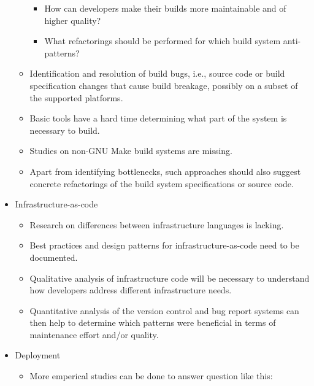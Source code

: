 \documentclass[]{book}
\providecommand{\tightlist}{%
  \setlength{\itemsep}{0pt}\setlength{\parskip}{0pt}}
\begin{document}
\begin{itemize}
\begin{itemize}
    \begin{itemize}
    \tightlist
    \item
      How can developers make their builds more maintainable and of
      higher quality?
    \item
      What refactorings should be performed for which build system
      anti-patterns?
    \end{itemize}
  \item
    Identification and resolution of build bugs, i.e., source code or
    build specification changes that cause build breakage, possibly on a
    subset of the supported platforms.
  \item
    Basic tools have a hard time determining what part of the system is
    necessary to build.
  \item
    Studies on non-GNU Make build systems are missing.
  \item
    Apart from identifying bottlenecks, such approaches should also
    suggest concrete refactorings of the build system specifications or
    source code.
  \end{itemize}
\item
  Infrastructure-as-code

  \begin{itemize}
  \tightlist
  \item
    Research on differences between infrastructure languages is lacking.
  \item
    Best practices and design patterns for infrastructure-as-code need
    to be documented.
  \item
    Qualitative analysis of infrastructure code will be necessary to
    understand how developers address different infrastructure needs.
  \item
    Quantitative analysis of the version control and bug report systems
    can then help to determine which patterns were beneficial in terms
    of maintenance effort and/or quality.
  \end{itemize}
\item
  Deployment

  \begin{itemize}
  \tightlist
  \item
    More emperical studies can be done to answer question like this:


\end{itemize}
\end{itemize}
\end{document}
